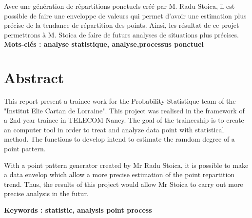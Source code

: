 \documentclass[stage2a]{tnreport}
\begin{document}
Avec une génération de répartitions ponctuels créé par M. Radu Stoica, il est possible de faire une enveloppe de valeurs qui permet d'avoir une estimation plus précise de la tendance de répartition des points. Ainsi, les résultat de ce projet permettrons à M. Stoica de faire de futurs analyses de situations plus précises.\\

{\bf Mots-clés : analyse statistique, analyse,processus ponctuel }


\section*{Abstract}

This report present a trainee work for the Probability-Statistique team of the "Institut Elie Cartan de Lorraine". This project was realised in the framework of a 2nd year trainee in TELECOM Nancy. The goal of the traineeship is to create an computer tool in order to treat and analyze data point with statistical method. The functions to develop intend to estimate the ramdom degree of a point pattern.

With a point pattern generator created by Mr Radu Stoica, it is possible to make a data envelop which allow a more precise estimation of the point repartition trend. Thus, the results of this project would allow Mr Stoica to carry out  more precise analysis in the futur.

{\bf Keywords : statistic, analysis point process}
\end{document}
